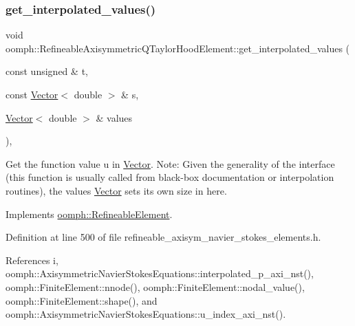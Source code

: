 \subsubsection{\texorpdfstring{get\+\_\+interpolated\+\_\+values()}{get\_interpolated\_values()}\hspace{0.1cm}{\footnotesize\ttfamily [2/2]}}
{\footnotesize\ttfamily void oomph\+::\+Refineable\+Axisymmetric\+Q\+Taylor\+Hood\+Element\+::get\+\_\+interpolated\+\_\+values (\begin{DoxyParamCaption}\item[{const unsigned \&}]{t,  }\item[{const \hyperlink{classoomph_1_1Vector}{Vector}$<$ double $>$ \&}]{s,  }\item[{\hyperlink{classoomph_1_1Vector}{Vector}$<$ double $>$ \&}]{values }\end{DoxyParamCaption})\hspace{0.3cm}{\ttfamily [inline]}, {\ttfamily [virtual]}}



Get the function value u in \hyperlink{classoomph_1_1Vector}{Vector}. Note\+: Given the generality of the interface (this function is usually called from black-\/box documentation or interpolation routines), the values \hyperlink{classoomph_1_1Vector}{Vector} sets its own size in here. 



Implements \hyperlink{classoomph_1_1RefineableElement_ada6f0efe831ffefb1d2829ce01d45bfc}{oomph\+::\+Refineable\+Element}.



Definition at line 500 of file refineable\+\_\+axisym\+\_\+navier\+\_\+stokes\+\_\+elements.\+h.



References i, oomph\+::\+Axisymmetric\+Navier\+Stokes\+Equations\+::interpolated\+\_\+p\+\_\+axi\+\_\+nst(), oomph\+::\+Finite\+Element\+::nnode(), oomph\+::\+Finite\+Element\+::nodal\+\_\+value(), oomph\+::\+Finite\+Element\+::shape(), and oomph\+::\+Axisymmetric\+Navier\+Stokes\+Equations\+::u\+\_\+index\+\_\+axi\+\_\+nst().

\mbox{\label{classoomph_1_1RefineableAxisymmetricQTaylorHoodElement_a812a3d6cf7355efa12fe27f46143e981}} 
